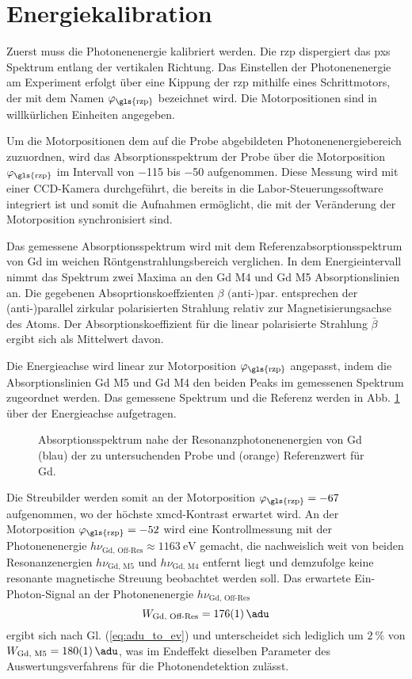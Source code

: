 \section{Energiekalibration}
Zuerst muss die Photonenenergie kalibriert werden. Die \gls{rzp} dispergiert das \gls{pxs} Spektrum entlang der vertikalen Richtung. Das Einstellen der Photonenenergie am Experiment erfolgt über eine Kippung der \gls{rzp} mithilfe eines Schrittmotors, der mit dem Namen $\varphi_\text{\gls{rzp}}$ bezeichnet wird. Die Motorpositionen sind in willkürlichen Einheiten angegeben.

\noindent
Um die Motorpositionen dem auf die Probe abgebildeten Photonenenergiebereich zuzuordnen, wird das Absorptionsspektrum der Probe über die Motorposition $\varphi_\text{\gls{rzp}}$ im Intervall von \num{-115} bis \num{-50} aufgenommen. Diese Messung wird mit einer CCD-Kamera durchgeführt, die bereits in die Labor-Steuerungssoftware integriert ist und somit die Aufnahmen ermöglicht, die mit der Veränderung der Motorposition synchronisiert sind.

\noindent
Das gemessene Absorptionsspektrum wird mit dem Referenzabsorptionsspektrum von Gd im weichen Röntgenstrahlungsbereich verglichen. In dem Energieintervall nimmt das Spektrum zwei Maxima an den Gd M4 und Gd M5 Absorptionslinien an. Die gegebenen \cite[Abb. 2]{prieto-x-ray-2005} Absoprtionskoeffzienten $\beta \text{ (anti-)par.}$ entsprechen der (anti-)parallel zirkular polarisierten Strahlung relativ zur Magnetisierungsachse des Atoms. Der Absorptionskoeffizient für die linear polarisierte Strahlung $\bar{\beta}$ ergibt sich als Mittelwert davon.

\noindent
Die Energieachse wird linear zur Motorposition $\varphi_\text{\gls{rzp}}$ angepasst, indem die Absorptionslinien Gd M5 und Gd M4 den beiden Peaks im gemessenen Spektrum zugeordnet werden. Das gemessene Spektrum und die Referenz werden in Abb. \ref{fig:rzp_phi_ev} über der Energieachse aufgetragen.
\begin{figure}[H]
    \centering
    
    \caption{Absorptionsspektrum nahe der Resonanzphotonenenergien von Gd (blau) der zu untersuchenden Probe und (orange) Referenzwert für Gd.}
    \label{fig:rzp_phi_ev}
\end{figure}
\noindent
Die Streubilder werden somit an der Motorposition $\varphi_\text{\gls{rzp}} = \num{-67}$ aufgenommen, wo der höchste \gls{xmcd}-Kontrast erwartet wird. An der Motorposition $\varphi_\text{\gls{rzp}} = \num{-52}$ wird eine Kontrollmessung mit der Photonenenergie $h\nu_\text{Gd, Off-Res} \approx \SI{1163}{\eV}$ gemacht, die nachweislich weit von beiden Resonanzenergien $h\nu_\text{Gd, M5}$ und $h\nu_\text{Gd, M4}$ entfernt liegt und demzufolge keine resonante magnetische Streuung beobachtet werden soll. Das erwartete Ein-Photon-Signal an der Photonenenergie $h\nu_\text{Gd, Off-Res}$ 
\begin{equation}
    W_\text{Gd, Off-Res} = \SI{176(1)}{\adu}
\end{equation}
ergibt sich nach Gl. (\ref{eq:adu_to_ev}) und unterscheidet sich lediglich um $\SI{2}{\percent}$ von $W_\text{Gd, M5} = \SI{180(1)}{\adu}$, was im Endeffekt dieselben Parameter des Auswertungsverfahrens für die Photonendetektion zulässt.

